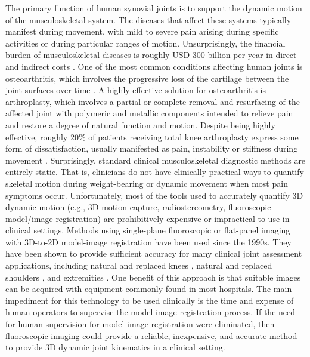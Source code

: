 The primary function of human synovial joints is to support the dynamic motion of the musculoskeletal system. The diseases that affect these systems typically manifest during movement, with mild to severe pain arising during specific activities or during particular ranges of motion. Unsurprisingly, the financial burden of musculoskeletal diseases is roughly USD 300 billion per year in direct and indirect costs \cite{BMUSBurdenMusculoskeletal}. One of the most common conditions affecting human joints is osteoarthritis, which involves the progressive loss of the cartilage between the joint surfaces over time \cite{sharmaOsteoarthritisCompanionRheumatology2007}. A highly effective solution for osteoarthritis is arthroplasty, which involves a partial or complete removal and resurfacing of the affected joint with polymeric and metallic components intended to relieve pain and restore a degree of natural function and motion. Despite being highly effective, roughly 20\% of patients receiving total knee arthroplasty express some form of dissatisfaction, usually manifested as pain, instability or stiffness during movement \cite{bakerRolePainFunction2007,scottPredictingDissatisfactionFollowing2010, bournePatientSatisfactionTotal2010}. Surprisingly, standard clinical musculoskeletal diagnostic methods are entirely static. That is, clinicians do not have clinically practical ways to quantify skeletal motion during weight-bearing or dynamic movement when most pain symptoms occur. Unfortunately, most of the tools used to accurately quantify 3D dynamic motion (e.g., 3D motion capture, radiostereometry, fluoroscopic model/image registration) are prohibitively expensive or impractical to use in clinical settings. Methods using single-plane fluoroscopic or flat-panel imaging with 3D-to-2D model-image registration have been used since the 1990s. They have been shown to provide sufficient accuracy for many clinical  joint assessment applications, including natural and replaced knees \cite{banksAccurateMeasurementThreedimensional1996, banksVivoKinematicsCruciateretaining1997, mahfouzRobustMethodRegistration2003, zuffiModelbasedMethodReconstruction1999}, natural and replaced shoulders \cite{matsukiVivo3DAnalysis2014, matsukiDynamicVivoGlenohumeral2012, zhuAccuracyRepeatabilityAutomatic2012, matsukiVivo3dimensionalAnalysis2011, kijimaVivo3dimensionalAnalysis2015}, and extremities \cite{yamaguchiAnkleSubtalarKinematics2009, listThreeDimensionalKinematicsUnconstrained2012, cenniFunctionalPerformanceTotal2013, cenniKinematicsThreeComponents2012, tersi3DElbowKinematics2009}. One benefit of this approach is that suitable images can be acquired with equipment commonly found in most hospitals. The main impediment for this technology to be used clinically is the time and expense of human operators to supervise the model-image registration process. If the need for human supervision for model-image registration were eliminated, then fluoroscopic imaging could provide a reliable, inexpensive, and accurate method to provide 3D dynamic joint kinematics in a clinical setting.
